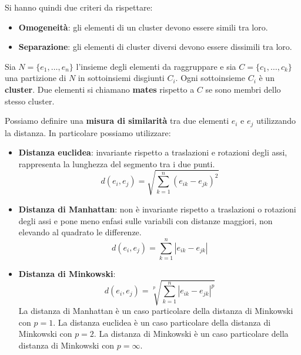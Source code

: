 Si hanno quindi due criteri da rispettare:
\begin{itemize}
    \item \textbf{Omogeneità}: gli elementi di un cluster devono essere simili tra loro.
    \item \textbf{Separazione}: gli elementi di cluster diversi devono essere dissimili tra loro.
\end{itemize}
\begin{definizione}
    Sia $N = \{e_1, \dots, e_n\}$ l'insieme degli elementi da raggruppare e sia $C = \{c_1, \dots, c_k\}$ una partizione di $N$ in sottoinsiemi disgiunti $C_i$. Ogni sottoinsieme $C_i$ è un \textbf{cluster}. Due elementi si chiamano \textbf{mates} rispetto a $C$ se sono membri dello stesso cluster.
\end{definizione}
\begin{definizione}
    Possiamo definire una \textbf{misura di similarità} tra due elementi $e_i$ e $e_j$ utilizzando la distanza. In particolare possiamo utilizzare:
    \begin{itemize}
        \item \textbf{Distanza euclidea}: invariante rispetto a traslazioni e rotazioni degli assi, rappresenta la lunghezza del segmento tra i due punti.
        \begin{equation}
             d(e_i, e_j) = \sqrt{\sum_{k=1}^n (e_{ik} - e_{jk})^2}
        \end{equation}
        \item \textbf{Distanza di Manhattan}: non è invariante rispetto a traslazioni o rotazioni degli assi e pone meno enfasi sulle variabili con distanze maggiori, non elevando al quadrato le differenze.
        \begin{equation}
            d(e_i, e_j) = \sum_{k=1}^n |e_{ik} - e_{jk}|
        \end{equation}
        \item \textbf{Distanza di Minkowski}:
        \begin{equation}
            d(e_i, e_j) = \sqrt[p]{\sum_{k=1}^n |e_{ik} - e_{jk}|^p}
        \end{equation}
        La distanza di Manhattan è un caso particolare della distanza di Minkowski con $p=1$. La distanza euclidea è un caso particolare della distanza di Minkowski con $p=2$. La distanza di Minkowski è un caso particolare della distanza di Minkowski con $p=\infty$.
    \end{itemize} 
\end{definizione}
